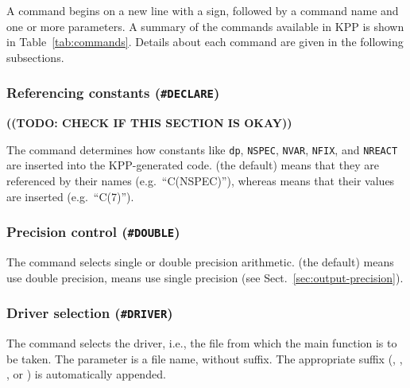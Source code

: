 \documentclass[twoside]{article}
\newcommand{\todo}[1]{{{\color{red}\uppercase{\bf ((TODO: #1))}}}}
\begin{document}
A command begins on a new line with a \code{#} sign, followed by a
command name and one or more parameters. A summary of the commands
available in KPP is shown in Table~\ref{tab:commands}. Details about
each command are given in the following subsections.

\subsubsection{Referencing constants ({\tt\#DECLARE})}
\label{sec:command-declare}

\todo{check if this section is okay}

The  command determines how constants like \verb|dp|,
\verb|NSPEC|, \verb|NVAR|, \verb|NFIX|, and \verb|NREACT| are inserted
into the KPP-generated code.  (the default) means that they
are referenced by their names (e.g.\ ``C(NSPEC)''), whereas 
means that their values are inserted (e.g.\ ``C(7)'').

\subsubsection{Precision control ({\tt\#DOUBLE})}
\label{sec:command-double}

The  command selects single or double precision
arithmetic.  (the default) means use double precision,
 means use single precision (see
Sect.~\ref{sec:output-precision}).

\subsubsection{Driver selection ({\tt\#DRIVER})}
\label{sec:command-driver}

The  command selects the driver, i.e., the file from which
the main function is to be taken. The parameter is a file name, without
suffix. The appropriate suffix (, , ,
or ) is automatically appended.
\end{document}
